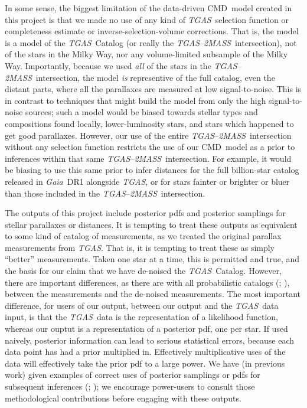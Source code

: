 \documentclass[modern]{aastex61}
\newcommand{\acronym}[1]{{\small{#1}}}
\newcommand{\project}[1]{\textsl{#1}}
\newcommand{\tgas}{\project{\acronym{TGAS}}}
\newcommand{\tmass}{\project{\acronym{2MASS}}}
\newcommand{\gaia}{\project{Gaia}}
\newcommand{\cmd}{\acronym{CMD}}
\begin{document}
In some sense, the biggest limitation of the data-driven \cmd\ model
created in this project is that we made no use of any kind of \tgas\ selection
function or completeness estimate or inverse-selection-volume corrections.
That is, the model is a model of the \tgas\ Catalog
(or really the \tgas--\tmass\ intersection), not of the stars in
the Milky Way, nor any volume-limited subsample of the Milky Way.
Importantly, because we used \emph{all} of the stars in the \tgas--\tmass\
intersection, the model \emph{is} representive of the full catalog,
even the distant parts, where all the parallaxes are measured at low
signal-to-noise.
This is in contrast to techniques that might build the model from only
the high signal-to-noise sources; such a model would be biased towards
stellar types and compositions found locally, lower-luminosity stars,
and stars which happened to get good parallaxes.
However, our use of the entire \tgas--\tmass\ intersection without
any selection function restricts the use of our \cmd\ model as a prior
to inferences within that same \tgas--\tmass\ intersection.
For example, it would be biasing to use this same prior to infer
distances for the full billion-star catalog released in \gaia\ DR1
alongside \tgas, or for stars fainter or brighter or bluer than those
included in the \tgas--\tmass\ intersection.

The outputs of this project include posterior pdfs and posterior
samplings for stellar parallaxes or distances.
It is tempting to treat these outputs as equivalent to some kind of catalog of
measurements, as we treated the original parallax measurements from \tgas.
That is, it is tempting to treat these as simply ``better'' measurements.
Taken one star at a time, this is permitted and true, and the basis for our
claim that we have de-noised the \tgas\ Catalog.
However, there are important differences, as there are with all
probabilistic catalogs (\citealt{hogg11}; \citealt{portillo17}), between the
measurements and the de-noised measurements.
The most important difference, for users of our output, between our
output and the \tgas\ data input, is that the \tgas\ data is the representation
of a likelihood function, whereas our ouptut is a
representation of a posterior pdf, one per star.
If used naively, posterior information can lead to serious statistical
errors, because each data point has had a prior multiplied in.
Effectively multiplicative uses of the data will effectively take the prior
pdf to a large power.
We have (in previous work)
given examples of correct uses of posterior samplings or pdfs
for subsequent inferences (\citealt{hogg08}; \citealt{dfm14}); we
encourage power-users to consult those methodological
contributions before engaging with these outputs.
\end{document}
